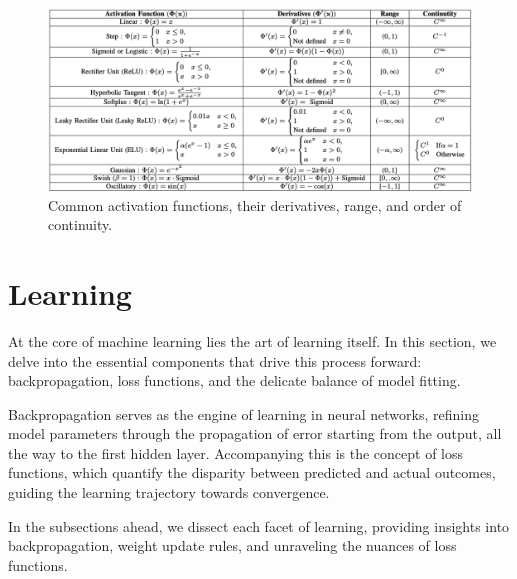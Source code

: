 \documentclass{article}
\begin{document}
\begin{figure}[b]
  \label{actfun}
  \includegraphics{ActFunTable}
\caption{Common activation functions, their derivatives, range, and order of continuity.}
\end{figure}

\newpage
\section{Learning}
  \label{sec:Learning}
  At the core of machine learning lies the art of learning itself. In this section, we delve into the essential components that drive this process forward: backpropagation, loss functions, and the delicate balance of model fitting.

Backpropagation serves as the engine of learning in neural networks, refining model parameters through the propagation of error starting from the output, all the way to the first hidden layer. Accompanying this is the concept of loss functions, which quantify the disparity between predicted and actual outcomes, guiding the learning trajectory towards convergence.

In the subsections ahead, we dissect each facet of learning, providing insights into backpropagation, weight update rules, and unraveling the nuances of loss functions.
  
\end{document}
